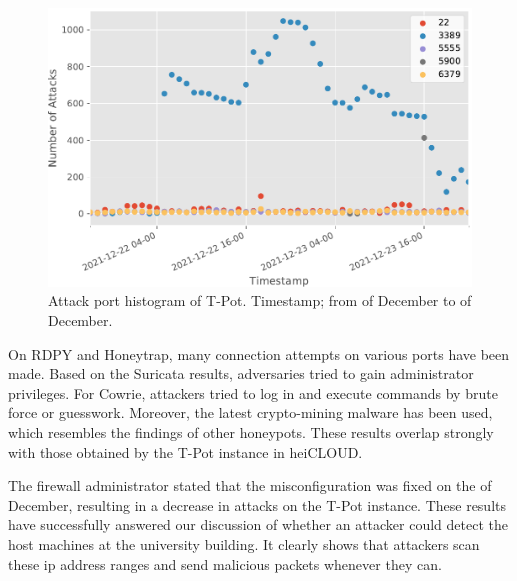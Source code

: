 \begin{figure}[htbp]
    \centering
    \includegraphics[width=\textwidth]{figures/tpot-misconfig-port.pdf}
    \caption[Attack port histogram of T-Pot]{
        Attack port histogram of T-Pot.
        Timestamp; from  of December to  of December.
    }
    \label{fig:tpot-misconfig-port-histogram}
\end{figure}

On RDPY and Honeytrap, many connection attempts on various ports have been made.
Based on the Suricata results, adversaries tried to gain administrator privileges.
For Cowrie, attackers tried to log in and execute commands by brute force or guesswork.
Moreover, the latest crypto-mining malware has been used, which resembles the findings of other honeypots.
These results overlap strongly with those obtained by the T-Pot instance in heiCLOUD.

The firewall administrator stated that the misconfiguration was fixed on the  of December, resulting in a decrease in attacks on the T-Pot instance.
These results have successfully answered our discussion of whether an attacker could detect the host machines at the university building.
It clearly shows that attackers scan these \ac{ip} address ranges and send malicious packets whenever they can.

